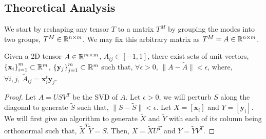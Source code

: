 \subsection{Theoretical Analysis}
We start by reshaping any tensor $T$ to a matrix $T^M$ by grouping the modes into two groups, $T^M \in \mathbb{R}^{n \times m}$. We may fix this arbitrary matrix as $T^M = A \in \mathbb{R}^{n \times m}$.
\begin{proposition}
\label{theory:prop1}
Given a 2D tensor $A\in \mathbb{R}^{m\times m}$, $A_{ij} \in [-1,1]$, there exist sets of unit vectors, $\left\{\mathbf{x}_i\right\}_{i=1}^m\subset \mathbb{R}^m$, $\left\{\mathbf{y}_j\right\}_{j=1}^m\subset \mathbb{R}^m$ such that, $\forall \epsilon > 0$, $\|A - \widetilde{A}\| < \epsilon$, where, $\forall i,j,\: \widetilde{A}_{ij}=\mathbf{x}_i^t\mathbf{y}_j$.
\end{proposition}
\begin{proof}
  Let $A=USV^T$ be the SVD of $A$. Let $\epsilon > 0$, we will perturb $S$ along the diagonal to generate $\widetilde{S}$ such that, $\|S - \widetilde{S}\| < \epsilon$. Let $X=\left[\mathbf{x}_i\right]$ and $Y=\left[\mathbf{y}_i\right]$. We will first give an algorithm to generate $\widetilde{X}$ and $\widetilde{Y}$ with each
  of its column being orthonormal such that, $\widetilde{X}^T\widetilde{Y}=S$. Then, $X=\widetilde{X}U^T$ and $Y=\widetilde{Y}V^T$. 


\end{proof}
